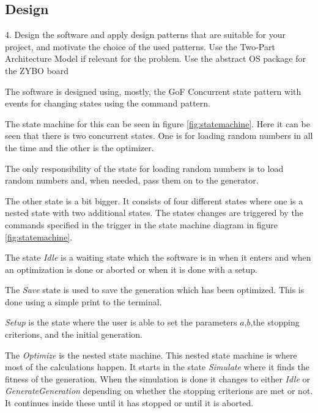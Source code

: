\subsection{Design}
\begin{framed}
4. Design the software and apply design patterns that are suitable for your project, and motivate the choice of the used patterns. Use the Two-Part Architecture Model if relevant for the problem. Use the abstract OS package for the ZYBO board
\end{framed}

The software is designed using, mostly, the GoF Concurrent state pattern with events for changing states  using the command pattern.

The state machine for this can be seen in figure \ref{fig:statemachine}. Here it can be seen that there is two concurrent states. One is for loading random numbers in all the time and the other is the optimizer.

The only responsibility of the state for loading random numbers is to load random numbers and, when needed, pass them on to the generator.

The other state is a bit bigger. It consists of four different states where one is a nested state with two additional states. 
The states changes are triggered by the commands specified in the trigger in the state machine diagram in figure \ref{fig:statemachine}.

The state \emph{Idle} is a waiting state which the software is in when it enters and when an optimization is done or aborted or when it is done with a setup.

The \emph{Save} state is used to save the generation which has been optimized. This is done using a simple print to the terminal. 

\emph{Setup} is the state where the user is able to set the parameters $a$,$b$,the stopping criterions, and the initial generation.

The \emph{Optimize} is the nested state machine. This nested state machine is where most of the calculations happen. It starts in the state \emph{Simulate} where it finds the fitness of the generation. When the simulation is done it changes to either \emph{Idle} or \emph{GenerateGeneration} depending on whether the stopping criterions are met or not. It continues inside these until it has stopped or until it is aborted.


